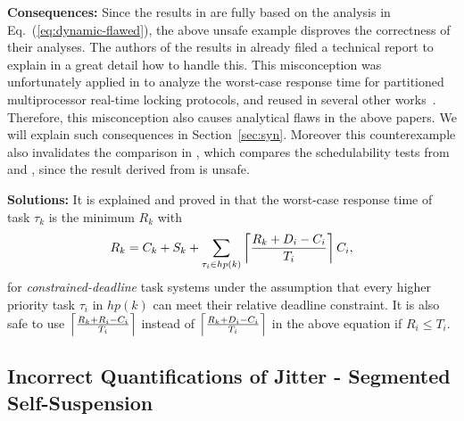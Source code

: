 
{\bf Consequences:} Since the results in \cite{ECRTS-AudsleyB04,RTAS-AudsleyB04,RTCSA-KimCPKH95} are fully based on the analysis in Eq.~(\ref{eq:dynamic-flawed}), the above unsafe example disproves the correctness of their analyses. The authors of the results in \cite{ECRTS-AudsleyB04,RTAS-AudsleyB04} already filed a technical report \cite{BletsasReport2015} to explain in a great detail how to handle this. This misconception was unfortunately applied in \cite{lakshmanan-2009} to analyze the worst-case response time for
partitioned multiprocessor real-time locking protocols, and reused in several other works~\cite{zeng-2011,bbb-2013,yang-2013,kim-2014,han-2014,carminati-2014,yang-2014}. Therefore, this misconception also causes analytical flaws in the above papers. We will explain such consequences in Section~\ref{sec:syn}.
Moreover this counterexample also invalidates the comparison in \cite{RidouardR06}, which compares the schedulability tests from \cite{RTCSA-KimCPKH95} and \cite[Page 164-165]{Liu:2000:RS:518501}, since the result derived from \cite{RTCSA-KimCPKH95} is unsafe.

{\bf Solutions:} It is explained and proved in \cite{huangpass:dac2015,BletsasReport2015} that the worst-case response time of task $\tau_k$ is the minimum $R_k$ with
\begin{equation}
R_k = C_k+ S_k+\sum_{\tau_i \in hp(k)}\left\lceil{\frac{R_k+D_i-C_i}{T_i}}\right\rceil C_i,
\label{eq:dynamic-correct}
\end{equation}
for \emph{constrained-deadline} task systems under the assumption that every higher priority task $\tau_i$ in $hp(k)$ can meet their relative deadline constraint. It is also safe to use $\left\lceil{\frac{R_k+R_i-C_i}{T_i}}\right\rceil$ instead of $\left\lceil{\frac{R_k+D_i-C_i}{T_i}}\right\rceil$ in the above equation if $R_i \leq T_i$.

\subsection{Incorrect Quantifications of Jitter - Segmented Self-Suspension}
\label{sec:wrong-jitter-segmented}


